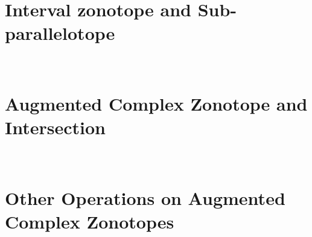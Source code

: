 

\section{Interval zonotope and Sub-parallelotope}~\label{sec:iztope}
 

\section{Augmented Complex Zonotope and Intersection}~\label{sec:acz-it}
 

\section{Other Operations on Augmented Complex Zonotopes}~\label{sec:operations-acz}

